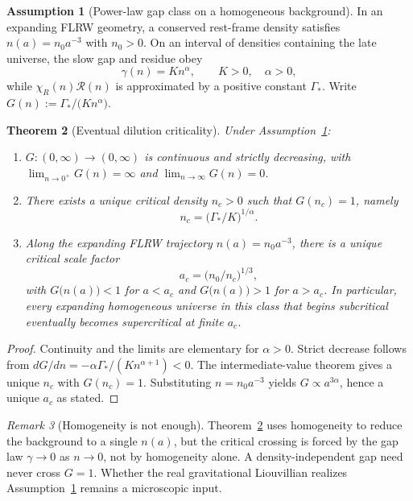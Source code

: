 \documentclass[11pt]{article}
\newtheorem{theorem}{Theorem}[section]
\theoremstyle{definition}
\newtheorem{assumption}[theorem]{Assumption}
\theoremstyle{remark}
\newtheorem{remark}[theorem]{Remark}
\begin{document}
\begin{assumption}[Power-law gap class on a homogeneous background]
\label{ass:eventual}
In an expanding FLRW geometry, a conserved rest-frame density satisfies $n(a)=n_0 a^{-3}$ with $n_0>0$.
On an interval of densities containing the late universe, the slow gap and residue obey
\begin{equation}
\gamma(n)=K n^{\alpha},\qquad K>0,\quad\alpha>0,
\end{equation}
while $\chi_R(n)\mathcal R(n)$ is approximated by a positive constant $\Gamma_*$.
Write $G(n):=\Gamma_*/\bigl(K n^{\alpha}\bigr)$.
\end{assumption}

\begin{theorem}[Eventual dilution criticality]
\label{thm:eventual}
Under Assumption~\ref{ass:eventual}:
\begin{enumerate}
\item $G:(0,\infty)\to(0,\infty)$ is continuous and strictly decreasing, with
$\lim_{n\to0^+}G(n)=\infty$ and $\lim_{n\to\infty}G(n)=0$.
\item There exists a unique critical density $n_c>0$ such that $G(n_c)=1$, namely
\begin{equation}
\boxed{n_c=\bigl(\Gamma_*/K\bigr)^{1/\alpha}.}
\end{equation}
\item Along the expanding FLRW trajectory $n(a)=n_0 a^{-3}$, there is a unique critical scale factor
\begin{equation}
\boxed{a_c=\bigl(n_0/n_c\bigr)^{1/3},}
\end{equation}
with $G\bigl(n(a)\bigr)<1$ for $a<a_c$ and $G\bigl(n(a)\bigr)>1$ for $a>a_c$.
In particular, every expanding homogeneous universe in this class that begins subcritical eventually becomes supercritical at finite $a_c$.
\end{enumerate}
\end{theorem}

\begin{proof}
Continuity and the limits are elementary for $\alpha>0$.
Strict decrease follows from $dG/dn=-\alpha\Gamma_*/(K n^{\alpha+1})<0$.
The intermediate-value theorem gives a unique $n_c$ with $G(n_c)=1$.
Substituting $n=n_0 a^{-3}$ yields $G\propto a^{3\alpha}$, hence a unique $a_c$ as stated.
\end{proof}

\begin{remark}[Homogeneity is not enough]
\label{rem:homo-not-enough}
Theorem~\ref{thm:eventual} uses homogeneity to reduce the background to a single $n(a)$, but the critical crossing is forced by the gap law $\gamma\to0$ as $n\to0$, not by homogeneity alone.
A density-independent gap need never cross $G=1$.
Whether the real gravitational Liouvillian realizes Assumption~\ref{ass:eventual} remains a microscopic input.
\end{remark}
\end{document}

